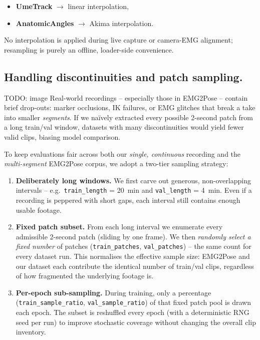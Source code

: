 \begin{itemize}
  \item \textbf{UmeTrack} $\to$ linear interpolation,
  \item \textbf{AnatomicAngles} $\to$ Akima interpolation.
\end{itemize}

No interpolation is applied during live capture or camera-EMG alignment;
resampling is purely an offline, loader-side convenience.

\subsection{Handling discontinuities and patch sampling.}
TODO: image
Real-world recordings -- especially those in EMG2Pose -- contain brief drop-outs:
marker occlusions, IK failures, or EMG glitches that break a take into smaller
\emph{segments}. If we naïvely extracted every possible 2-second patch from a
long train/val window, datasets with many discontinuities would yield fewer
valid clips, biasing model comparison.

To keep evaluations fair across both our \emph{single, continuous} recording
and the \emph{multi-segment} EMG2Pose corpus, we adopt a two-tier sampling
strategy:

\begin{enumerate}[label=\arabic*.]

  \item \textbf{Deliberately long windows.}
        We first carve out generous, non-overlapping intervals -- 
        e.g.\ \texttt{train\_length} = \SI{20}{min} and
        \texttt{val\_length} = \SI{4}{min}.
        Even if a recording is peppered with short gaps, each interval still
        contains enough usable footage.

  \item \textbf{Fixed patch subset.}
        From each long interval we enumerate every admissible 2-second patch
        (sliding by one frame).
        We then \emph{randomly select a fixed number} of patches
        (\texttt{train\_patches}, \texttt{val\_patches}) -- the same count for
        every dataset run.
        This normalises the effective sample size: EMG2Pose and our dataset
        each contribute the identical number of train/val clips, regardless of
        how fragmented the underlying footage is.

  \item \textbf{Per-epoch sub-sampling.}
        During training, only a percentage
        (\texttt{train\_sample\_ratio}, \texttt{val\_sample\_ratio}) of that
        fixed patch pool is drawn each epoch.
        The subset is reshuffled every epoch (with a deterministic RNG seed per
        run) to improve stochastic coverage without changing the overall clip
        inventory.

\end{enumerate}

